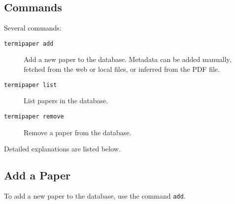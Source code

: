 \subsection{Commands}
Several commands:
\begin{description}
  \item[\texttt{termipaper add}] Add a new paper to the database.
    Metadata can be added manually, fetched from the web or local files,
    or inferred from the PDF file.
  \item[\texttt{termipaper list}] List papers in the database.
  \item[\texttt{termipaper remove}] Remove a paper from the database.
\end{description}

Detailed explanations are listed below.

\subsection{Add a Paper}\label{subsec:termipaper-add}
To add a new paper to the database, use the command \texttt{add}.

